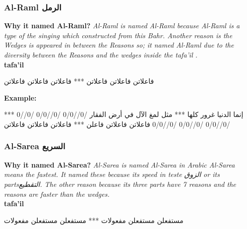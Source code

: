 \subsubsection{Al-Raml \textarabic{الرمل}}
\textbf{Why it named Al-Raml?}
\textit{Al-Raml is named Al-Raml because Al-Raml is a type of the singing which constructed from this Bahr. Another reason is the Wedges is appeared in between the Reasons so; it named Al-Raml due to the diversity between the Reasons and the wedges inside the tafa'il \cite{Alkafi1994}.}\\

\textbf{tafa'il}

\begin{Arabic}
  \begin{traditionalpoem*}

    فاعلاتن فاعلاتن فاعلاتن *** فاعلاتن فاعلاتن فاعلاتن


	\end{traditionalpoem*}
      \end{Arabic}


\textbf{Example:}

\begin{Arabic}
  \begin{traditionalpoem*}

    إنما الدنيا غرور كلها *** مثل لمغ اﻵل في أرض الفقار
    /0//0/0 /0//0/0 /0//0 *** /0//0/0 /0//0/0 /0//0/0
    فاعلاتن فاعلاتن فاعلن *** فاعلاتن فاعلاتن فاعلاتن


	\end{traditionalpoem*}
      \end{Arabic}




\subsubsection{Al-Sarea \textarabic{السريع}}
\textbf{Why it named Al-Sarea?}
\textit{Al-Sarea is named Al-Sarea in Arabic Al-Sarea means the fastest. It named these because its speed in teste \textarabic{الزوق} or its parts\textarabic{التقطيع}. The other reason because its three parts have 7 reasons and the reasons are faster than the wedges.\cite{Alkafi1994}}\\

\textbf{tafa'il}

\begin{Arabic}
  \begin{traditionalpoem*}

مستفعلن مستفعلن مفعولات *** مستفعلن مستفعلن مفعولات

	\end{traditionalpoem*}
      \end{Arabic}


